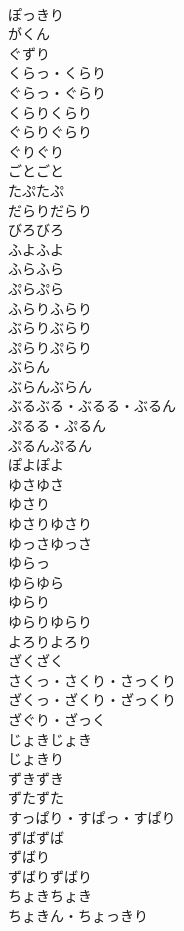 \documentclass[8pt]{extreport}
\begin{document}
\begin{CJK}{UTF8}{min}
\\	ぽっきり	
\\	がくん	
\\	ぐずり	
\\	くらっ・くらり	
\\	ぐらっ・ぐらり	
\\	くらりくらり	
\\	ぐらりぐらり	
\\	ぐりぐり	
\\	ごとごと	
\\	たぷたぷ	
\\	だらりだらり	
\\	びろびろ	
\\	ふよふよ	
\\	ふらふら	
\\	ぷらぷら	
\\	ふらりふらり	
\\	ぶらりぶらり	
\\	ぷらりぷらり	
\\	ぶらん	
\\	ぶらんぶらん	
\\	ぶるぶる・ぶるる・ぶるん	
\\	ぷるる・ぷるん	
\\	ぷるんぷるん	
\\	ぽよぽよ	
\\	ゆさゆさ	
\\	ゆさり	
\\	ゆさりゆさり	
\\	ゆっさゆっさ	
\\	ゆらっ	
\\	ゆらゆら	
\\	ゆらり	
\\	ゆらりゆらり	
\\	よろりよろり	
\\	ざくざく	
\\	さくっ・さくり・さっくり	
\\	ざくっ・ざくり・ざっくり	
\\	ざぐり・ざっく	
\\	じょきじょき	
\\	じょきり	
\\	ずきずき	
\\	ずたずた	
\\	すっぱり・すぱっ・すぱり	
\\	ずばずば	
\\	ずばり	
\\	ずばりずばり	
\\	ちょきちょき	
\\	ちょきん・ちょっきり	

\end{CJK}
\end{document}
